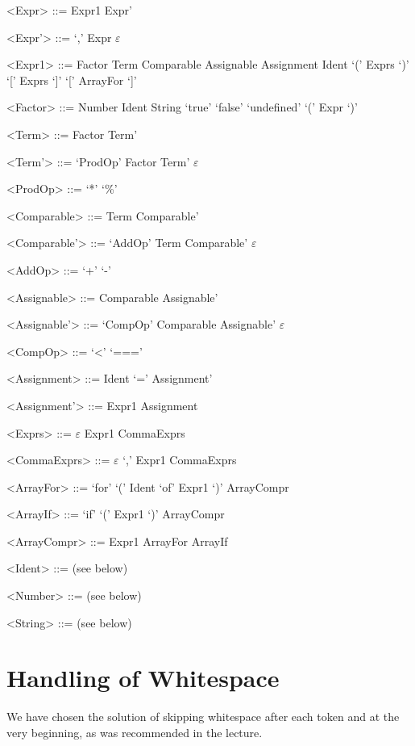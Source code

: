 \documentclass{article}
\begin{document}
\begin{grammar}
	\let\syntleft\relax
	\let\syntright\relax
	
	<Expr> ::= Expr1 Expr'
	
	<Expr'> ::= `,' Expr
	\alt $\varepsilon$

	<Expr1> ::= Factor
	\alt Term
	\alt Comparable
	\alt Assignable
	\alt Assignment
	\alt Ident `(' Exprs `)'
	\alt `[' Exprs `]'
	\alt `[' ArrayFor `]'
		
	<Factor> ::= Number
	\alt Ident
	\alt String
	\alt `true'
	\alt `false'
	\alt `undefined'
	\alt `(' Expr `)'
	
	<Term> ::= Factor Term'
	
	<Term'> ::= `ProdOp' Factor Term'
	\alt $\varepsilon$
	
	<ProdOp> ::= `*'
	\alt `\%'
	
	<Comparable> ::= Term Comparable'
	
	<Comparable'> ::= `AddOp' Term Comparable'
	\alt $\varepsilon$
	
	<AddOp> ::= `+'
	\alt `-'
	
	<Assignable> ::= Comparable Assignable'
	
	<Assignable'> ::= `CompOp' Comparable Assignable'
	\alt $\varepsilon$
	
	
	<CompOp> ::= `<'
	\alt `==='
	
	<Assignment> ::= Ident `=' Assignment'
	
	<Assignment'> ::= Expr1
	\alt Assignment
	
	<Exprs> ::= $\varepsilon$
	\alt Expr1 CommaExprs	
	
	<CommaExprs> ::= $\varepsilon$
	\alt `,' Expr1 CommaExprs
	
	<ArrayFor> ::= `for' `(' Ident `of' Expr1 `)' ArrayCompr
	
	<ArrayIf> ::= `if' `(' Expr1 `)' ArrayCompr
	
	<ArrayCompr> ::= Expr1
	\alt ArrayFor
	\alt ArrayIf
	
	<Ident> ::= (see below)
	
	<Number> ::= (see below)
	
	<String> ::= (see below)
\end{grammar}


\section{Handling of Whitespace}
We have chosen the solution of skipping whitespace after each token and at the very beginning, as was recommended in the lecture.
\end{document}
